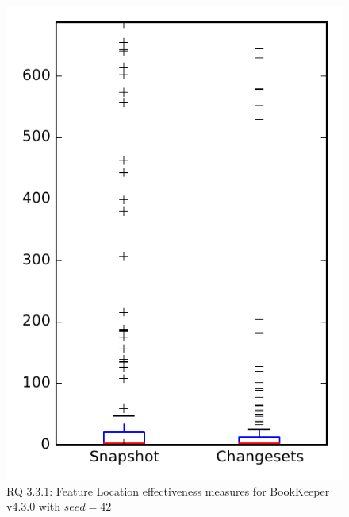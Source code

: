 
\begin{figure}
\centering
\includegraphics[height=0.4\textheight]{figures/flt_seed/rq1_bookkeeper_42}
\caption{RQ 3.3.1: Feature Location effectiveness measures for BookKeeper v4.3.0 with $seed=42$}
\label{fig:flt_seed:rq1:bookkeeper}
\end{figure}
